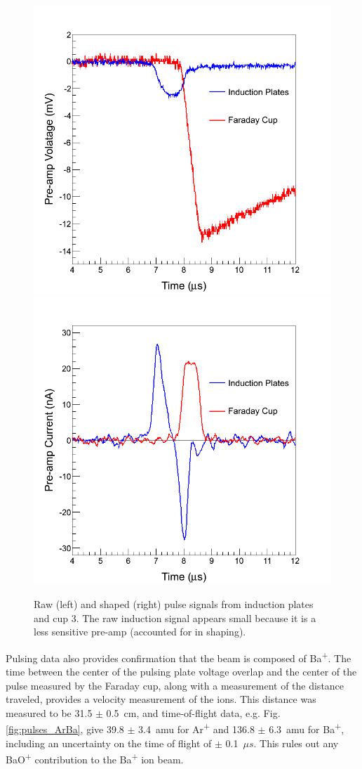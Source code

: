 \begin{figure} %
                \includegraphics[width=.49\textwidth]{figures/pulse_ind_cup3_raw.png}
                \includegraphics[width=.49\textwidth]{figures/pulse_ind_cup3_shaped.png}
                \caption{Raw (left) and shaped (right) pulse signals from induction plates and cup 3.  The raw induction signal appears small because it is a less sensitive pre-amp (accounted for in shaping).}
        \label{fig:pulse_raw_shaped}
\end{figure}

Pulsing data also provides confirmation that the beam is composed of Ba\textsuperscript{+}.  The time between the center of the pulsing plate voltage overlap and the center of the pulse measured by the Faraday cup, along with a measurement of the distance traveled, provides a velocity measurement of the ions.  This distance was measured to be 31.5 $\pm$ 0.5~cm, and time-of-flight data, e.g. Fig. \ref{fig:pulses_ArBa}, give 39.8 $\pm$ 3.4~amu for Ar\textsuperscript{+} and 136.8 $\pm$ 6.3~amu for Ba\textsuperscript{+}, including an uncertainty on the time of flight of $\pm$ 0.1~$\mu s$.  This rules out any BaO\textsuperscript{+} contribution to the Ba\textsuperscript{+} ion beam.

